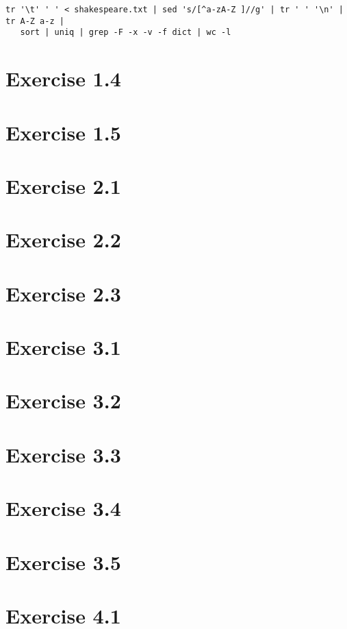 \documentclass{article}
\begin{document}
\begin{verbatim}
tr '\t' ' ' < shakespeare.txt | sed 's/[^a-zA-Z ]//g' | tr ' ' '\n' | tr A-Z a-z | 
   sort | uniq | grep -F -x -v -f dict | wc -l
\end{verbatim}


\section{Exercise 1.4}
\section{Exercise 1.5}

\section{Exercise 2.1}
\section{Exercise 2.2}
\section{Exercise 2.3}

\section{Exercise 3.1}
\section{Exercise 3.2}
\section{Exercise 3.3}
\section{Exercise 3.4}
\section{Exercise 3.5}

\section{Exercise 4.1}
\end{document}
